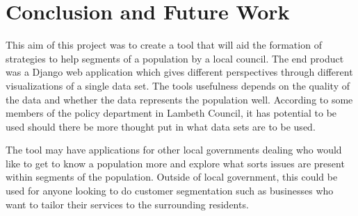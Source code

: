\chapter{Conclusion and Future Work}

This aim of this project was to create a tool that will aid the formation of strategies to help segments of a population by a local council. The end product was a Django web application which gives different perspectives through different visualizations of a single data set. The tool\textsc{}s usefulness depends on the quality of the data and whether the data represents the population well. According to some members of the policy department in Lambeth Council, it has potential to be used should there be more thought put in what data sets are to be used.\par

The tool may have applications for other local governments dealing who would like to get to know a population more and explore what sorts issues are present within segments of the population. Outside of local government, this could be used for anyone looking to do customer segmentation such as businesses who want to tailor their services to the surrounding residents.

